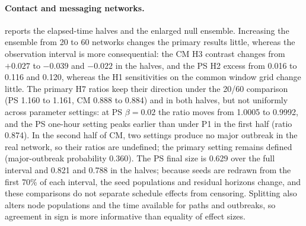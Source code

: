 \paragraph{Contact and messaging networks.}
 reports the elapsed-time halves and the enlarged null ensemble.
Increasing the ensemble from 20 to 60 networks changes the primary results little, whereas
the observation interval is more consequential: the CM H3 contrast changes from $+0.027$
to $-0.039$ and $-0.022$ in the halves, and the PS H2 excess from 0.016 to 0.116 and 0.120,
whereas the H1 sensitivities on the common window grid change little. The primary H7 ratios keep
their direction under the 20/60 comparison (PS 1.160 to 1.161, CM 0.888 to 0.884) and in
both halves, but not uniformly across parameter settings: at PS $\beta=0.02$ the ratio moves
from 1.0005 to 0.9992, and the PS one-hour setting peaks earlier than under P1 in the first
half (ratio 0.874). In the second half of CM, two settings produce no major outbreak in the
real network, so their ratios are undefined; the primary setting remains defined
(major-outbreak probability 0.360). The PS final size is 0.629 over the full interval and
0.821 and 0.788 in the halves; because seeds are redrawn from the first 70\% of each
interval, the seed populations and residual horizons change, and these comparisons do not
separate schedule effects from censoring. Splitting also alters node populations and the
time available for paths and outbreaks, so agreement in sign is more informative than
equality of effect sizes.

